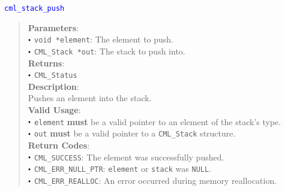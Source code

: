 \documentclass[a4paper,oneside,10pt]{article}
\newcommand{\function}[1]{
  \noindent\textcolor{blue}{\texttt{#1}}
  \vspace{-0.3em}
}
\renewcommand{\dot}{\raisebox{0.3ex}{\scalebox{0.6}{$\bullet$}}}
\theoremstyle{definition}
\begin{document}
\function{cml\_stack\_push}
\begin{quote}
  \textbf{Parameters}: \\
  $\dot$ \texttt{void *element}: The element to push. \\
  $\dot$ \texttt{CML\_Stack *out}: The stack to push into. \\
  \textbf{Returns}: \\
  $\dot$ \texttt{CML\_Status} \\
  
  \vspace{-0.75em}
  \textbf{Description}: \\
  Pushes an element into the stack. \\

  \vspace{-0.75em}
  \textbf{Valid Usage}: \\
  $\dot$ \texttt{element} \textbf{must} be a valid pointer to an element of the stack's type. \\
  $\dot$ \texttt{out} \textbf{must} be a valid pointer to a \texttt{CML\_Stack} structure. \\

  \vspace{-0.75em}
  \textbf{Return Codes}: \\
  $\dot$ \texttt{CML\_SUCCESS}: The element was successfully pushed. \\
  $\dot$ \texttt{CML\_ERR\_NULL\_PTR}: \texttt{element} or \texttt{stack} was \texttt{NULL}. \\
  $\dot$ \texttt{CML\_ERR\_REALLOC}: An error occurred during memory reallocation. \\
\end{quote}
\end{document}
